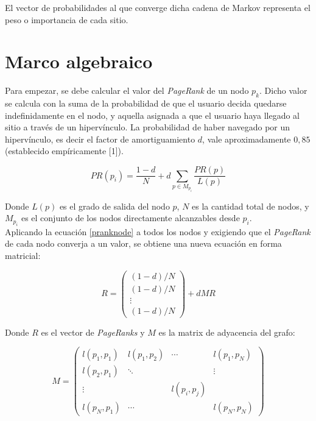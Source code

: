 \documentclass[%
    final,
    notitlepage,
    narroweqnarray,
    inline,
    twoside,
    invited
    ]{ieee}
\begin{document}
El vector de probabilidades al que converge dicha cadena de Markov representa el peso o importancia de cada sitio.

\section{Marco algebraico}

\par Para empezar, se debe calcular el valor del \textit{PageRank} de un nodo $p_{k}$. Dicho valor se calcula con la suma de la probabilidad de que el usuario
decida quedarse indefinidamente en el nodo, y aquella asignada a que el usuario haya llegado al sitio a través de un hipervínculo. La probabilidad
de haber navegado por un hipervínculo, es decir el factor de amortiguamiento $d$, vale aproximadamente $0,85$ (establecido empíricamente [1]).

\begin{equation}\label{pranknode}
PR(p_i) = \frac{1-d}{N} + d \sum_{p \in M_{p_{i}}} \frac{PR(p)}{L(p)}
\end{equation}

Donde $L(p)$ es el grado de salida del nodo $p$, $N$ es la cantidad total de nodos, y $M_{p_i}$ es el conjunto de los nodos directamente alcanzables
desde $p_i$.\\

Aplicando la ecuación \eqref{pranknode} a todos los nodos y exigiendo que el \textit{PageRank} de cada nodo converja a un valor,
se obtiene una nueva ecuación en forma matricial:

\begin{equation}\label{pranksolution}
R = \begin{pmatrix}
(1-d)/N \\ (1-d)/N \\ \vdots \\ (1-d)/N
\end{pmatrix} + dMR
\end{equation}

Donde $R$ es el vector de \textit{PageRanks} y $M$ es la matrix de adyacencia del grafo:

\begin{equation}\label{M}
M=\begin{pmatrix}
l(p_{1},p_{1}) & l(p_{1},p_{2}) & \cdots & l(p_{1},p_{N}) \\
l(p_{2},p_{1}) & \ddots & & \vdots \\
\vdots & & l(p_{i}, p_{j}) & \\
l(p_{N},p_{1}) & \cdots &  & l(p_{N},p_{N})
\end{pmatrix}
\end{equation}
\end{document}
